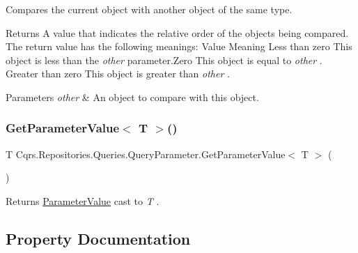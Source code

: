Compares the current object with another object of the same type. 

\begin{DoxyReturn}{Returns}
A value that indicates the relative order of the objects being compared. The return value has the following meanings\+: Value Meaning Less than zero This object is less than the {\itshape other}  parameter.\+Zero This object is equal to {\itshape other} . Greater than zero This object is greater than {\itshape other} . 
\end{DoxyReturn}

\begin{DoxyParams}{Parameters}
{\em other} & An object to compare with this object.\\
\hline
\end{DoxyParams}
\mbox{\label{classCqrs_1_1Repositories_1_1Queries_1_1QueryParameter_a14f2f14cba8d0807bb80d7b8d2c7e59a_a14f2f14cba8d0807bb80d7b8d2c7e59a}} 
\subsubsection{\texorpdfstring{Get\+Parameter\+Value$<$ T $>$()}{GetParameterValue< T >()}}
{\footnotesize\ttfamily T Cqrs.\+Repositories.\+Queries.\+Query\+Parameter.\+Get\+Parameter\+Value$<$ T $>$ (\begin{DoxyParamCaption}{ }\end{DoxyParamCaption})}



Returns \hyperlink{classCqrs_1_1Repositories_1_1Queries_1_1QueryParameter_a0d1c69ffc864aeda2eb515a9e57fbd7a_a0d1c69ffc864aeda2eb515a9e57fbd7a}{Parameter\+Value} cast to {\itshape T} . 



\subsection{Property Documentation}
\mbox{\label{classCqrs_1_1Repositories_1_1Queries_1_1QueryParameter_a9e2242ad5acffe4e99d4945e4b88be8d_a9e2242ad5acffe4e99d4945e4b88be8d}} 
